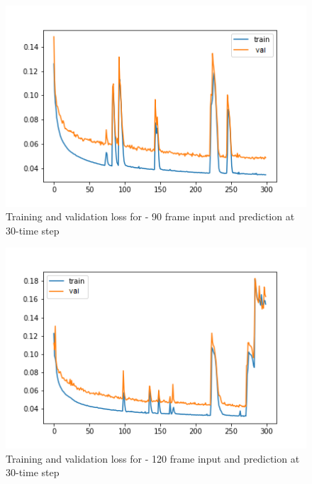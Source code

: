 \begin{figure}[H] 
\includegraphics[scale=0.8]{conf17_300e_90_30ffuture}
\begin{center}
\caption{Training and validation loss for - 90 frame input and prediction at 30-time step }
\label{90-30}
\end{center}
\end{figure}

\begin{figure}[H] 
\includegraphics[scale=0.8]{conf18_300e_120_30ffuture}
\begin{center}
\caption{Training and validation loss for - 120 frame input and prediction at 30-time step }
\label{120-30}
\end{center}
\end{figure}

